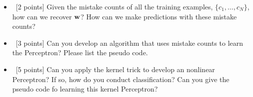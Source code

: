 \documentclass[12pt, fullpage,letterpaper]{article}
\begin{document}
\begin{enumerate}
	\begin{itemize}
		\item~[2 points] Given the mistake counts of all the training examples, $\{c_1, \ldots, c_N\}$, how can we recover ${\bf w}$? How can we make predictions with these mistake counts? 
		\item~[3 points] Can you develop an algorithm that uses mistake counts to learn the Perceptron? Please list the pseudo code. 
		\item~[5 points] Can you apply the kernel trick to develop an nonlinear Perceptron? If so, how do you conduct classification? Can you give the pseudo code fo learning this kernel Perceptron? 
	\end{itemize}   
	
\end{enumerate}
\end{document}
